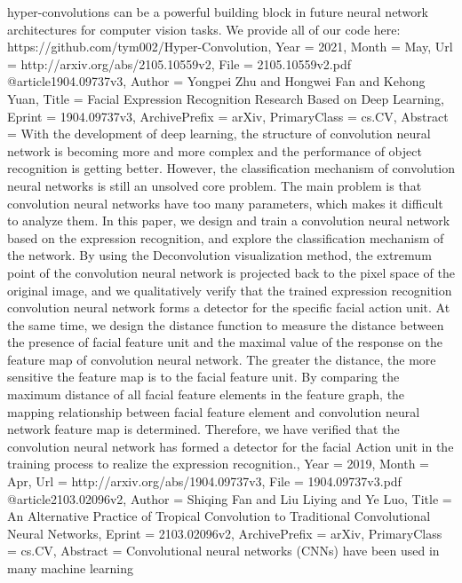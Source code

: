 {{{{{hyper-convolutions can be a powerful building block in future neural network
architectures for computer vision tasks. We provide all of our code here:
https://github.com/tym002/Hyper-Convolution},
Year          = {2021},
Month         = {May},
Url           = {http://arxiv.org/abs/2105.10559v2},
File          = {2105.10559v2.pdf}
}
@article{1904.09737v3,
Author        = {Yongpei Zhu and Hongwei Fan and Kehong Yuan},
Title         = {Facial Expression Recognition Research Based on Deep Learning},
Eprint        = {1904.09737v3},
ArchivePrefix = {arXiv},
PrimaryClass  = {cs.CV},
Abstract      = {With the development of deep learning, the structure of convolution neural
network is becoming more and more complex and the performance of object
recognition is getting better. However, the classification mechanism of
convolution neural networks is still an unsolved core problem. The main problem
is that convolution neural networks have too many parameters, which makes it
difficult to analyze them. In this paper, we design and train a convolution
neural network based on the expression recognition, and explore the
classification mechanism of the network. By using the Deconvolution
visualization method, the extremum point of the convolution neural network is
projected back to the pixel space of the original image, and we qualitatively
verify that the trained expression recognition convolution neural network forms
a detector for the specific facial action unit. At the same time, we design the
distance function to measure the distance between the presence of facial
feature unit and the maximal value of the response on the feature map of
convolution neural network. The greater the distance, the more sensitive the
feature map is to the facial feature unit. By comparing the maximum distance of
all facial feature elements in the feature graph, the mapping relationship
between facial feature element and convolution neural network feature map is
determined. Therefore, we have verified that the convolution neural network has
formed a detector for the facial Action unit in the training process to realize
the expression recognition.},
Year          = {2019},
Month         = {Apr},
Url           = {http://arxiv.org/abs/1904.09737v3},
File          = {1904.09737v3.pdf}
}
@article{2103.02096v2,
Author        = {Shiqing Fan and Liu Liying and Ye Luo},
Title         = {An Alternative Practice of Tropical Convolution to Traditional
  Convolutional Neural Networks},
Eprint        = {2103.02096v2},
ArchivePrefix = {arXiv},
PrimaryClass  = {cs.CV},
Abstract      = {Convolutional neural networks (CNNs) have been used in many machine learning
}}}}}

